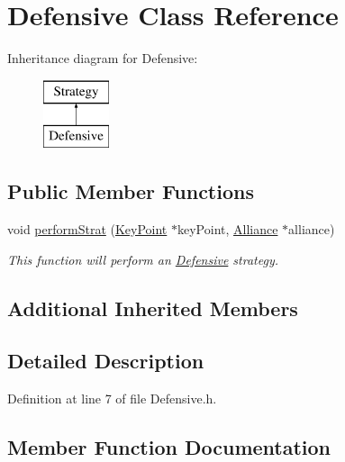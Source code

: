 \hypertarget{classDefensive}{}\section{Defensive Class Reference}
\label{classDefensive}
Inheritance diagram for Defensive\+:\begin{figure}[H]
\begin{center}
\leavevmode
\includegraphics[height=2.000000cm]{classDefensive}
\end{center}
\end{figure}
\subsection*{Public Member Functions}
\begin{DoxyCompactItemize}
\item 
void \hyperlink{classDefensive_a4cc4f2f71160bcade2cf2be8ade39903}{perform\+Strat} (\hyperlink{classKeyPoint}{Key\+Point} $\ast$key\+Point, \hyperlink{classAlliance}{Alliance} $\ast$alliance)
\begin{DoxyCompactList}\small\item\em This function will perform an \hyperlink{classDefensive}{Defensive} strategy. \end{DoxyCompactList}\end{DoxyCompactItemize}
\subsection*{Additional Inherited Members}


\subsection{Detailed Description}


Definition at line 7 of file Defensive.\+h.



\subsection{Member Function Documentation}
\mbox{\label{classDefensive_a4cc4f2f71160bcade2cf2be8ade39903}} 
